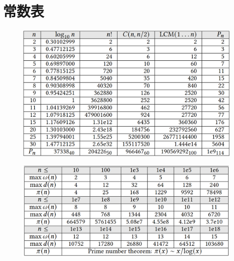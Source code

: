\section{常数表}

\begin{figure}[htb]
    \centering
    \includegraphics[width=\textwidth]{images/constant-table1.png}
\end{figure}

\begin{figure}[htb]
    \centering
    \includegraphics[width=\textwidth]{images/constant-table2.png}
\end{figure}
